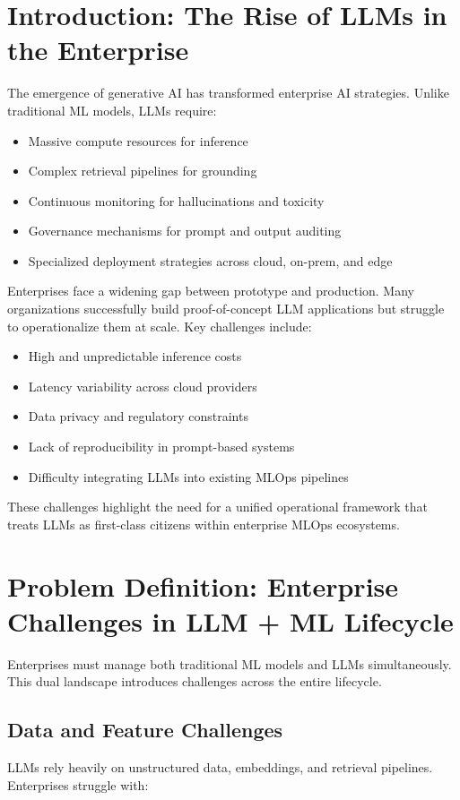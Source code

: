 \documentclass[11pt]{article}
\begin{document}
\section{Introduction: The Rise of LLMs in the Enterprise}
The emergence of generative AI has transformed enterprise AI strategies. Unlike traditional ML models, LLMs require:

\begin{itemize}[leftmargin=1.2cm]
    \item Massive compute resources for inference
    \item Complex retrieval pipelines for grounding
    \item Continuous monitoring for hallucinations and toxicity
    \item Governance mechanisms for prompt and output auditing
    \item Specialized deployment strategies across cloud, on-prem, and edge
\end{itemize}

Enterprises face a widening gap between prototype and production. Many organizations successfully build proof-of-concept LLM applications but struggle to operationalize them at scale. Key challenges include:

\begin{itemize}[leftmargin=1.2cm]
    \item High and unpredictable inference costs
    \item Latency variability across cloud providers
    \item Data privacy and regulatory constraints
    \item Lack of reproducibility in prompt-based systems
    \item Difficulty integrating LLMs into existing MLOps pipelines
\end{itemize}

These challenges highlight the need for a unified operational framework that treats LLMs as first-class citizens within enterprise MLOps ecosystems.

\section{Problem Definition: Enterprise Challenges in LLM + ML Lifecycle}
Enterprises must manage both traditional ML models and LLMs simultaneously. This dual landscape introduces challenges across the entire lifecycle.

\subsection{Data and Feature Challenges}
LLMs rely heavily on unstructured data, embeddings, and retrieval pipelines. Enterprises struggle with:
\end{document}

